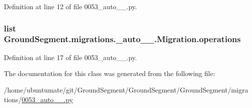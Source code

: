 Definition at line 12 of file 0053\+\_\+auto\+\_\+\_.\+py.

\hypertarget{class_ground_segment_1_1migrations_1_10053__auto__20170325__1256_1_1_migration_aa76520d4d9f417fa02d64c94d16d2c92}{}
\subsubsection[{operations}]{\setlength{\rightskip}{0pt plus 5cm}list Ground\+Segment.\+migrations.\+\_\+auto\+\_\+\_.\+Migration.\+operations\hspace{0.3cm}{\ttfamily [static]}}\label{class_ground_segment_1_1migrations_1_10053__auto__20170325__1256_1_1_migration_aa76520d4d9f417fa02d64c94d16d2c92}


Definition at line 17 of file 0053\+\_\+auto\+\_\+\_.\+py.



The documentation for this class was generated from the following file\+:\begin{DoxyCompactItemize}
\item 
/home/ubuntumate/git/\+Ground\+Segment/\+Ground\+Segment/\+Ground\+Segment/migrations/\hyperlink{0053__auto__20170325__1256_8py}{0053\+\_\+auto\+\_\+\_.\+py}\end{DoxyCompactItemize}

